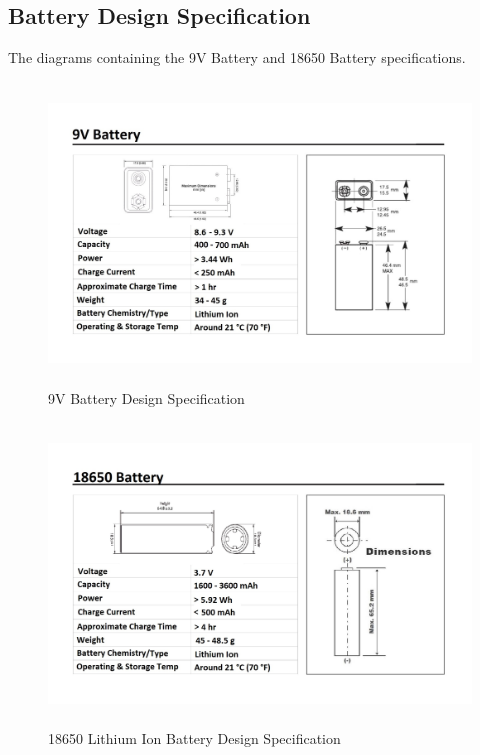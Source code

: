 \documentclass[12pt]{article}
\begin{document}
{{{{		\subsection{Battery Design Specification}
			The diagrams containing the 9V Battery and 18650 Battery specifications.
			\begin{figure}[!htb]
				\centering
				\includegraphics[width = 140mm, height = 80mm]{assets/9V_Battery.jpg}
				\caption{9V Battery Design Specification \label{overflow}}
			\end{figure}
			
			\begin{figure}[!htb]
				\centering
				\includegraphics[width = 140mm, height = 80mm]{assets/18650_Battery.jpg}
				\caption{18650 Lithium Ion Battery Design Specification \label{overflow}}
			\end{figure}
		
}}}}
\end{document}
